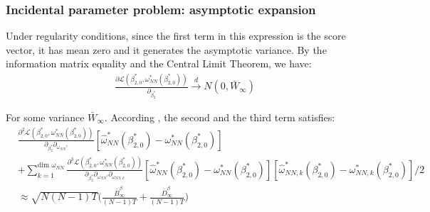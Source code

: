 \begin{frame}
        \frametitle{Incidental parameter problem: asymptotic expansion}
    Under regularity conditions, since the first term in this expression is the score vector, it has mean zero and it generates the asymptotic variance. By the information matrix equality and the Central Limit Theorem, we have:
    \begin{align} \label{eq:exp_1}
        \frac{\partial \mathcal{L} ({\beta}_{2,0}^*, {\omega}_{NN}^*(\beta_{2,0}^*))}{\partial_{\beta_{2}^*} }  \xrightarrow{d} N(0, \bar{W}_\infty)
    \end{align}
    
    For some variance $\bar{W}_\infty$. According \cite{fernandez2016individual}, the second and the third term satisfies:
    \begin{align} \label{eq:exp_2}
        &\frac{\partial^2 \mathcal{L} ({\beta}_{2,0}^*, {\omega}_{NN}^*(\beta_{2,0}^*)) }{\partial_{\beta_{2}^*}\partial_{\omega_{NN}'} }[ \hat{\omega}_{NN}^* (\beta_{2,0}^*) - \omega_{NN}^* (\beta_{2,0}^*)]  \nonumber\\
        &+ \sum_{k = 1}^{\text{dim } \omega_{NN}} \frac{\partial^3 \mathcal{L} ({\beta}_{2,0}^*, {\omega}_{NN}^*(\beta_{2,0}^*))}{\partial_{\beta_{2}^*}\partial_{\omega_{NN}'}\partial_{\omega_{NN,k}}}[ \hat{\omega}_{NN}^* (\beta_{2,0}^*) - \omega_{NN}^* (\beta_{2,0}^*)] [ \hat{\omega}_{NN,k}^* (\beta_{2,0}^*) - \omega_{NN,k}^* (\beta_{2,0}^*)] / 2 \nonumber \\
        & \approx \sqrt{N(N-1)T} \Big( \frac{\bar{B}^\beta_\infty}{(N-1)T} + \frac{\bar{D}^\beta_\infty}{(N-1)T} \Big)
    \end{align}
\end{frame}

